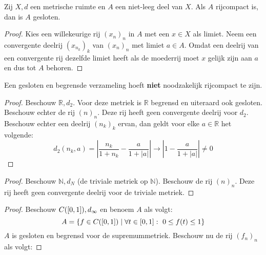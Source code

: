 \documentclass[main.tex]{subfiles}
\begin{document}
\begin{bst}
  \label{st:rijcompact-dan-gesloten}
  Zij $X,d$ een metrische ruimte en $A$ een niet-leeg deel van $X$.
  Als $A$ rijcompact is, dan is $A$ gesloten.
  \begin{proof}
      Kies een willekeurige rij $(x_{n})_{n}$ in $A$ met een $x\in X$ als limiet.
      Neem een convergente deelrij $(x_{n_{k}})_{k}$ van $(x_{n})_{n}$ met limiet $a\in A$.
      Omdat een deelrij van een convergente rij dezelfde limiet heeft als de moederrij moet $x$ gelijk zijn aan $a$ en dus tot $A$ behoren.
  \end{proof}
\end{bst}

\begin{tvb}
  Een gesloten en begrensde verzameling hoeft \textbf{niet} noodzakelijk rijcompact te zijn.

  \begin{proof}
    Beschouw $\mathbb{R},d_{2}$.
    Voor deze metriek is $\mathbb{R}$ begrensd en uiteraard ook gesloten.
    Beschouw echter de rij $(n)_{n}$.
    Deze rij heeft geen convergente deelrij voor $d_{2}$.
    Beschouw echter een deelrij $(n_{k})_{k}$ ervan, dan geldt voor elke $a\in \mathbb{R}$ het volgende:
    \[ d_{2}(n_{k},a) = \left| \frac{n_{k}}{1+n_{k}} - \frac{a}{1+|a|} \right| \rightarrow \left|1-\frac{a}{1+|a|}\right| \neq 0 \]
  \end{proof}
  \begin{proof}
    Beschouw $\mathbb{N},d_{N}$ (de triviale metriek op $\mathbb{N}$).
    Beschouw de rij $(n)_{n}$.
    Deze rij heeft geen convergente deelrij voor de triviale metriek.
  \end{proof}
  \begin{proof}
    Beschouw $C(\interval{0}{1}),d_{\infty}$ en benoem $A$ als volgt:
    \[ A = \{ f\in C(\interval{0}{1}) \mid \forall t\in \interval{0}{1}:\ 0 \le f(t) \le 1 \} \]
    $A$ is gesloten en begrensd voor de supremummetriek.
    Beschouw nu de rij $(f_{n})_{n}$ als volgt:


\end{proof}
\end{tvb}
\end{document}

